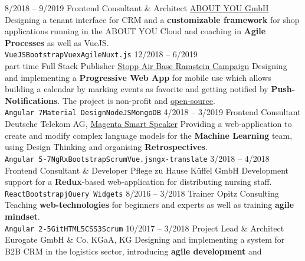 \documentclass[9pt]{developercv} %
\begin{document}
\begin{entrylist}
  \entry
		{8/2018 -- 9/2019}
		{Frontend Consultant \& Architect}
		{\href{https://cloud.aboutyou.com/}{ABOUT YOU GmbH}}
    {
      Designing a tenant interface for CRM and a \textbf{customizable framework} for shop applications
      running in the ABOUT YOU Cloud and coaching in \textbf{Agile Processes} as well as VueJS.\\
      \texttt{VueJS}\slashsep\texttt{Bootstrap}\slashsep\texttt{Vuex}\slashsep\texttt{Agile}\slashsep\texttt{Nuxt.js}
    }
	\entry
		{12/2018 -- 6/2019\\\footnotesize{part time}}
		{Full Stack Publisher}
		{\href{https://www.ramstein-kampagne.eu/}{Stopp Air Base Ramstein Campaign}}
    {
      Designing and implementing a \textbf{Progressive Web App} for mobile use which allows building a calendar by
      marking events as favorite and getting notified by \textbf{Push-Notifications}. The project is non-profit and
      \href{https://github.com/frot-io/ramstein-conference-app}{open-source}.\\
      \texttt{Angular 7}\slashsep\texttt{Material Design}\slashsep\texttt{NodeJS}\slashsep\texttt{MongoDB}
    }
  \entry
		{4/2018 -- 3/2019}
		{Frontend Consultant}
		{Deutsche Telekom AG, \href{https://www.telekom.de/zuhause/geraete-und-zubehoer/smart-speaker}{Magenta Smart Speaker}}
    {
      Providing a web-application to create and modify complex language models for the
      \textbf{Machine Learning} team, using Design Thinking and organising \textbf{Retrospectives}.\\
      \texttt{Angular 5-7}\slashsep\texttt{NgRx}\slashsep\texttt{Bootstrap}\slashsep\texttt{Scrum}\slashsep\texttt{Vue.js}\slashsep\texttt{ngx-translate}
    }
	\entry
		{3/2018 -- 4/2018}
		{Frontend Consultant \& Developer}
		{Pflege zu Hause Küffel GmbH}
		{
      Development support for a \textbf{Redux}-based web-application for distributing nursing staff.\\
      \texttt{React}\slashsep\texttt{Bootstrap}\slashsep\texttt{jQuery Widgets}
    }
  \entry
		{8/2016 -- 3/2018}
		{Trainer}
		{Opitz Consulting}
		{
      Teaching \textbf{web-technologies} for beginners and experts as well as training \textbf{agile mindset}.\\
      \texttt{Angular 2-5}\slashsep\texttt{Git}\slashsep\texttt{HTML5}\slashsep\texttt{CSS3}\texttt{Scrum}
    }
  \entry
		{10/2017 -- 3/2018}
		{Project Lead \& Architect}
		{Eurogate GmbH \& Co. KGaA, KG}
		{
      Designing and implementing a system for B2B CRM in the logistics sector, introducing \textbf{agile development} and 
}
\end{entrylist}
\end{document}
